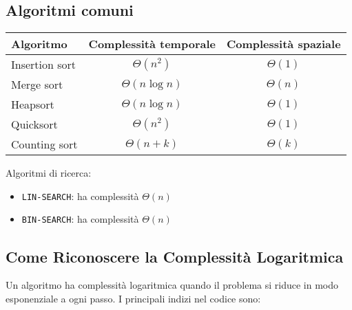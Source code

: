 \subsection{Algoritmi comuni}

\begin{center}
    \begin{tabular}{|l|c|c|}
        \hline
        \textbf{Algoritmo} & \textbf{Complessità temporale} & \textbf{Complessità spaziale} \\
        \hline
        Insertion sort & $\Theta(n^2)$ & $\Theta(1)$ \\
        \hline
        Merge sort & $\Theta(n \log n)$ & $\Theta(n)$ \\
        \hline
        Heapsort & $\Theta(n \log n)$ & $\Theta(1)$ \\
        \hline
        Quicksort & $\Theta(n^2)$ & $\Theta(1)$ \\
        \hline
        Counting sort & $\Theta(n+k)$ & $\Theta(k)$ \\
        \hline
    \end{tabular}
\end{center}

Algoritmi di ricerca:

\begin{itemize}
    \item \texttt{LIN-SEARCH}: ha complessità $\Theta(n)$
    \item \texttt{BIN-SEARCH}: ha complessità $\Theta(n)$
\end{itemize}

\subsection{Come Riconoscere la Complessità Logaritmica}

Un algoritmo ha complessità logaritmica quando il problema si riduce in modo esponenziale a ogni passo. I principali indizi nel codice sono:

